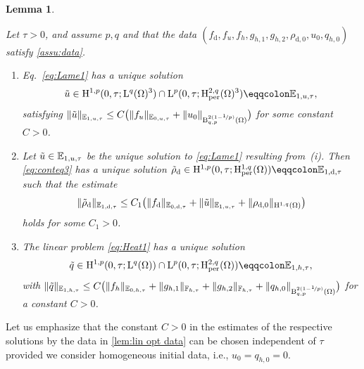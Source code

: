 \documentclass[10pt]{amsart}
\theoremstyle{plain}
\newtheorem{lem}[lem]{Lemma}
\theoremstyle{definition}
\theoremstyle{thm}
\numberwithin{equation}{section}
\newcommand{\rL}{\mathrm{L}}
\newcommand{\rLq}{\rL^q}
\newcommand{\rLp}{\rL^p}
\newcommand{\rH}{\mathrm{H}}
\newcommand{\rB}{\mathrm{B}}
\newcommand{\E}{\mathbb{E}}
\newcommand{\F}{\mathbb{F}}
\newcommand{\per}{\mathrm{per}}
\newcommand{\rd}{\mathrm{d}}
\newcommand{\trho}{\Tilde{\rho}}
\newcommand{\tu}{\Tilde{u}}
\newcommand{\tq}{\Tilde{q}}
\begin{document}
\begin{lem}\label{lem:lin opt data}

Let $\tau>0$, and assume $p,q$ and that the data $(f_\rd,f_u,f_h,g_{h,1},g_{h,2},\rho_{\rd,0},u_0,q_{h,0})$ satisfy \autoref{assu:data}.

\begin{enumerate}
    \item Eq.~\eqref{eq:Lame1} has a unique solution
    \begin{equation*}
        \tu \in \rH^{1,p}(0,\tau;\rLq(\Omega)^3) \cap \rLp(0,\tau;\rH_\per^{2,q}(\Omega)^3) \eqqcolon \E_{1,u,\tau},
    \end{equation*}
    satisfying $\| \tu \|_{\E_{1,u,\tau}} \le C \bigl(\| f_u\|_{\E_{0,u,\tau}}  + \| u_0 \|_{\rB_{q,p}^{2(1-\nicefrac{1}{p})}(\Omega)}\bigr)$ for some constant $C > 0$.
    \item Let $\tu \in \E_{1,u,\tau}$ be the unique solution to \eqref{eq:Lame1} resulting from~(i).
    Then \eqref{eq:conteq3} has a unique solution 
    $\trho_\rd \in \rH^{1,p}(0,\tau; \rH_\per^{1,q}(\Omega)) \eqqcolon \E_{1,\rd,\tau}$ such that the estimate 
    \begin{equation*}
        \| \trho_\rd \|_{\E_{1,\rd,\tau}} \le C_1\bigl(\| f_\rd \|_{\E_{0,\rd,\tau}} + \| \tu \|_{\E_{1,u,\tau}} + \| \rho_{\rd,0} \|_{\rH^{1,q}(\Omega)} \bigr )
    \end{equation*}
    holds for some $C_1 > 0$.
    \item The linear problem \eqref{eq:Heat1} has a unique solution 
    \begin{equation*}
        \tq \in \rH^{1,p}(0,\tau;\rLq(\Omega)) \cap \rLp(0,\tau;\rH_\per^{2,q}(\Omega)) \eqqcolon \E_{1,h,\tau},
    \end{equation*}
    with $\| \tq \|_{\E_{1,h,\tau}} \le C\bigl(\| f_h \|_{\E_{0,h,\tau}} + \| g_{h,1} \|_{ \F_{h,\tau}} +\| g_{h,2} \|_{ \F_{h,\tau}} + \| q_{h,0} \|_{\rB_{q,p}^{2(1-\nicefrac{1}{p})}(\Omega) }\bigr)$ for a constant $C > 0$.
\end{enumerate}
\end{lem}

Let us emphasize that the constant $C > 0$ in the estimates of the respective solutions by the data in \autoref{lem:lin opt data} can be chosen independent of $\tau$ provided we consider homogeneous initial data, i.e., $u_0 = q_{h,0}=0$. 
\end{document}
